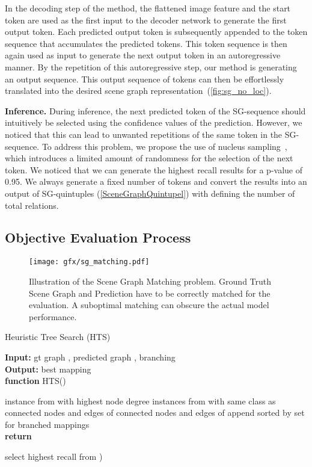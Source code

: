 \documentclass[10pt,twocolumn,letterpaper]{article}
\begin{document}
In the decoding step of the method, the flattened image feature and the start token are used as the first input to the decoder network to generate the first output token. Each predicted output token is subsequently appended to the token sequence that accumulates the predicted tokens. This token sequence is then again used as input to generate the next output token in an autoregressive manner. By the repetition of this autoregressive step, our method is generating an output sequence. This output sequence of tokens can then be effortlessly translated into the desired scene graph representation~(\cref{fig:sg_no_loc}).

\noindent\textbf{Inference.} 
During inference, the next predicted token of the SG-sequence should intuitively be selected using the confidence values of the prediction. However, we noticed that this can lead to unwanted repetitions of the same token in the SG-sequence. To address this problem, we propose the use of nucleus sampling~\cite{holtzman_curious_2020}, which introduces a limited amount of randomness for the selection of the next token. We noticed that we can generate the highest recall results for a p-value of 0.95. We always generate a fixed number of tokens and convert the results into an output of  SG-quintuples (\cref{SceneGraphQuintupel}) with  defining the number of total relations.

\subsection{Objective Evaluation Process}

\begin{figure*}[t]
  \centering
   \texttt{[image: gfx/sg\_matching.pdf]}
   \caption{Illustration of the Scene Graph Matching problem. Ground Truth Scene Graph and Prediction have to be correctly matched for the evaluation. A suboptimal matching can obscure the actual model performance.}
   \label{fig:sg_matching_problem}
\end{figure*}

\begin{algorithm}
\caption{Heuristic Tree Search (HTS)} 
\textbf{Input:} gt graph , predicted graph , branching \\
\textbf{Output:} best mapping  \\
\textbf{function} HTS()
\begin{algorithmic}
\State  instance from  with highest node degree
\State  instances from  with same class as 
\State  connected nodes and edges of 
\State  connected nodes and edges of 
\State  append 
        \EndFor
    \State  sorted by 
        \State   set for branched mappings \For{ : }{~ }
        \If{} 
        \Else{~ }    
        \EndIf
   \EndFor\\
\textbf{return} 

\end{algorithmic}
 select highest recall from )
\label{tree_based_matching}
\end{algorithm}
\end{document}
